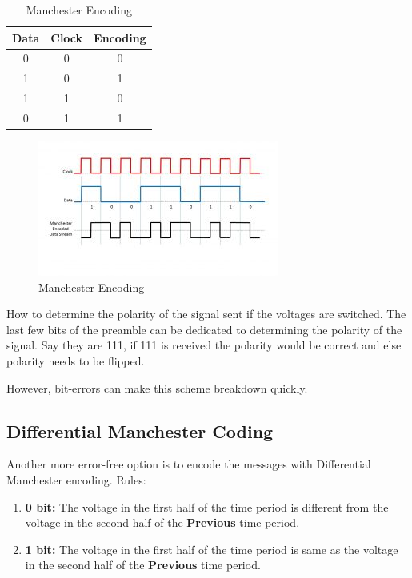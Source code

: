 \documentclass[12pt]{article}
\newcommand{\tbox}[1]{\noindent\fbox{\parbox{\textwidth}{#1}}}
\begin{document}
\begin{table}[h]
    \centering
    \begin{tabular}{|c|c|c|}
         \hline
         Data & Clock & Encoding \\ \hline
         0 & 0 & 0 \\ \hline
         1 & 0 & 1 \\ \hline
         1 & 1 & 0 \\ \hline
         0 & 1 & 1 \\ \hline
    \end{tabular}
    \caption{Manchester Encoding}
    \label{tab:Manchester_encoding}
\end{table}


\begin{figure}[H]
    \centering
    \includegraphics{Diagrams/Manchester_Encoding.jpg}
    \caption{Manchester Encoding}
    \label{fig:encoding}
\end{figure}

\newpage
\noindent\tbox{
    \begin{center}
    \textbf{\Huge Lecture 7}
    \end{center}
}


How to determine the polarity of the signal sent if the voltages are switched. 
The last few bits of the preamble can be dedicated to determining the polarity of the signal. 
Say they are 111, if 111 is received the polarity would be correct and else polarity needs to be flipped. 

However, bit-errors can make this scheme breakdown quickly.

\subsection{Differential Manchester Coding}
Another more error-free option is to encode the messages with Differential Manchester encoding. 
Rules: 
\begin{enumerate}
    \item \textbf{0 bit:} The voltage in the first half of the time period is different from the 
    voltage in the second half of the \textbf{Previous} time period. 
    \item \textbf{1 bit:} The voltage in the first half of the time period is same as the 
    voltage in the second half of the \textbf{Previous} time period.
\end{enumerate}
\end{document}
